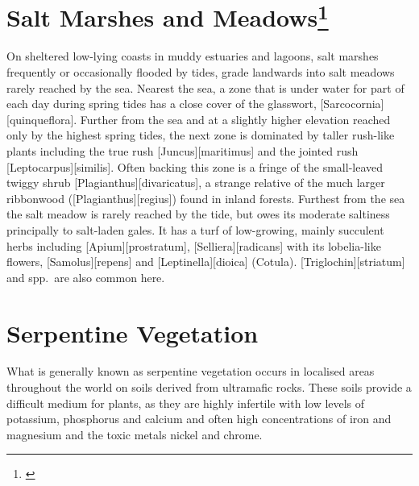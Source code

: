 \section[Salt Marshes and Meadows]{Salt Marshes and Meadows\footnote{\cite{moore1963plants}}}

On sheltered low-lying coasts in muddy estuaries and lagoons, salt marshes frequently or occasionally flooded by tides, grade landwards into salt meadows rarely reached by the sea.
Nearest the sea, a zone that is under water for part of each day during spring tides has a close cover of the glasswort, [Sarcocornia][quinqueflora].
Further from the sea and at a slightly higher elevation reached only by the highest spring tides, the next zone is dominated by taller rush-like plants including the true rush [Juncus][maritimus] and the jointed rush [Leptocarpus][similis].
Often backing this zone is a fringe of the small-leaved twiggy shrub [Plagianthus][divaricatus], a strange relative of the much larger ribbonwood ([Plagianthus][regius]) found in inland forests.
Furthest from the sea the salt meadow is rarely reached by the tide, but owes its moderate saltiness principally to salt-laden gales.
It has a turf of low-growing, mainly succulent herbs including [Apium][prostratum], [Selliera][radicans] with its lobelia-like flowers, [Samolus][repens] and [Leptinella][dioica] (Cotula). [Triglochin][striatum] and  spp.\ are also common here.

\section{Serpentine Vegetation}

What is generally known as serpentine vegetation occurs in localised areas throughout the world on soils derived from ultramafic rocks.
These soils provide a difficult medium for plants, as they are highly infertile with low levels of potassium, phosphorus and calcium and often high concentrations of iron and magnesium and the toxic metals nickel and chrome.

